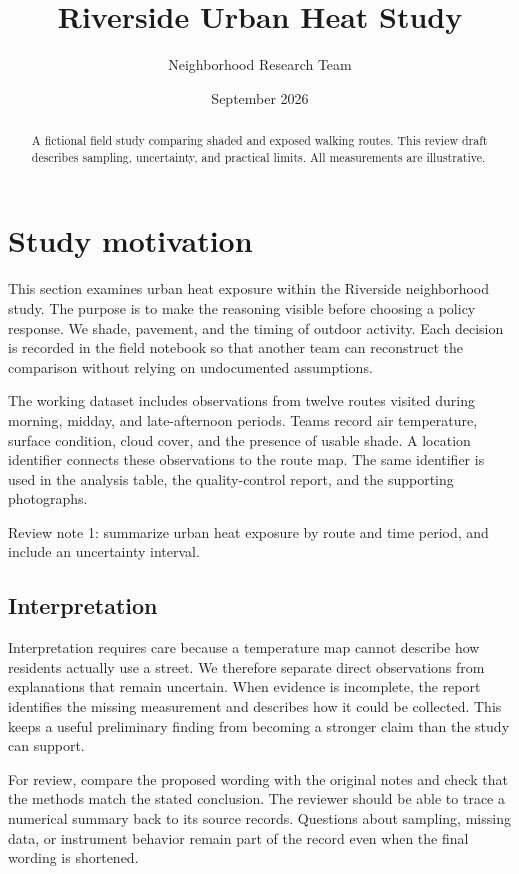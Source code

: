 \documentclass[11pt]{article}
\title{Riverside Urban Heat Study}
\author{Neighborhood Research Team}
\date{September 2026}
\begin{document}
\maketitle
\begin{abstract}
A fictional field study comparing shaded and exposed walking routes. This review draft describes sampling, uncertainty, and practical limits. All measurements are illustrative.
\end{abstract}
\tableofcontents
\newpage
\section{Study motivation}
This section examines urban heat exposure within the Riverside neighborhood study. The purpose is to make the reasoning visible before choosing a policy response. We shade, pavement, and the timing of outdoor activity. Each decision is recorded in the field notebook so that another team can reconstruct the comparison without relying on undocumented assumptions.

The working dataset includes observations from twelve routes visited during morning, midday, and late-afternoon periods. Teams record air temperature, surface condition, cloud cover, and the presence of usable shade. A location identifier connects these observations to the route map. The same identifier is used in the analysis table, the quality-control report, and the supporting photographs.

Review note 1: summarize urban heat exposure by route and time period, and include an uncertainty interval.

\subsection{Interpretation}
Interpretation requires care because a temperature map cannot describe how residents actually use a street. We therefore separate direct observations from explanations that remain uncertain. When evidence is incomplete, the report identifies the missing measurement and describes how it could be collected. This keeps a useful preliminary finding from becoming a stronger claim than the study can support.

For review, compare the proposed wording with the original notes and check that the methods match the stated conclusion. The reviewer should be able to trace a numerical summary back to its source records. Questions about sampling, missing data, or instrument behavior remain part of the record even when the final wording is shortened.
\end{document}

